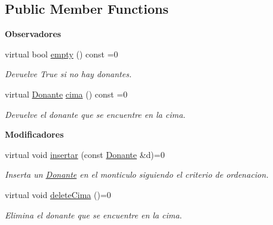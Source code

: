 \subsection*{Public Member Functions}
\begin{Indent}{\bf Observadores}\par
\begin{DoxyCompactItemize}
\item 
virtual bool \hyperlink{classed_1_1MonticuloInterfaz_a05c64243f7062b1cf9cf38813e5c1e70}{empty} () const =0
\begin{DoxyCompactList}\small\item\em Devuelve True si no hay donantes. \end{DoxyCompactList}\item 
virtual \hyperlink{classed_1_1Donante}{Donante} \hyperlink{classed_1_1MonticuloInterfaz_a2c30c4a9cb2f95fb14e19cca895a75b6}{cima} () const =0
\begin{DoxyCompactList}\small\item\em Devuelve el donante que se encuentre en la cima. \end{DoxyCompactList}\end{DoxyCompactItemize}
\end{Indent}
\begin{Indent}{\bf Modificadores}\par
\begin{DoxyCompactItemize}
\item 
virtual void \hyperlink{classed_1_1MonticuloInterfaz_a3800d68ce174f398a3ab0c6eca4e855f}{insertar} (const \hyperlink{classed_1_1Donante}{Donante} \&d)=0
\begin{DoxyCompactList}\small\item\em Inserta un \hyperlink{classed_1_1Donante}{Donante} en el monticulo siguiendo el criterio de ordenacion. \end{DoxyCompactList}\item 
virtual void \hyperlink{classed_1_1MonticuloInterfaz_a27f0c644317d820494a28459d913bc8f}{delete\+Cima} ()=0\hypertarget{classed_1_1MonticuloInterfaz_a27f0c644317d820494a28459d913bc8f}{}\label{classed_1_1MonticuloInterfaz_a27f0c644317d820494a28459d913bc8f}

\begin{DoxyCompactList}\small\item\em Elimina el donante que se encuentre en la cima. \end{DoxyCompactList}\end{DoxyCompactItemize}
\end{Indent}


